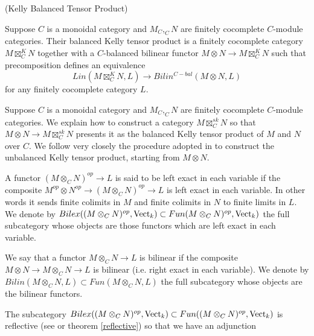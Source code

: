 \begin{definition} \label{definition/kelly-balanced-tensor-product} (Kelly Balanced Tensor Product)

  \noindent Suppose $C$ is a monoidal category and $M_C, _{C}N$ are finitely
  cocomplete $C$-module categories. Their balanced Kelly tensor product is a
  finitely cocomplete category $M\boxtimes^K_C N$ together with a $C$-balanced
  bilinear functor $M\otimes N\to M\boxtimes^K_C N$ such that precomposition
  defines an equivalence $$Lin(M\boxtimes^K_C N,L)\to Bilin^{C-bal}(M\otimes
  N, L)$$ for any finitely cocomplete category $L$.
\end{definition}

\noindent Suppose $C$ is a monoidal category and $M_C, _{C}N$ are finitely cocomplete
$C$-module categories. We explain how to construct a category
$M\boxtimes_C^{sk}N$ so that $M\otimes N\to M\boxtimes_C^{sk}N$ presents it as
the balanced Kelly tensor product of $M$ and $N$ over $C$. We follow very
closely the procedure adopted in \cite{lopezfranco/tensor-products} to
construct the unbalanced Kelly tensor product, starting from $M\otimes N$.

\begin{definition}

  \noindent A functor $(M\otimes_C N)^{op}\to L$ is said to be left exact in
  each variable if the composite $M^{op}\otimes N^{op}\to (M\otimes_C
  N)^{op}\to L$ is left exact in each variable. In other words it sends finite
  colimits in $M$ and finite colimits in $N$ to finite limits in $L$. We
  denote by $Bilex((M\otimes_C N)^{op},\operatorname{Vect}_k)\subset Fun(M\otimes_C
  N)^{op},\operatorname{Vect}_k)$ the full subcategory whose objects are those functors
  which are left exact in each variable.
\end{definition}

\begin{definition}

  \noindent We say that a functor $M\otimes_C N \to L$ is bilinear if the
  composite $M\otimes N\to M\otimes_C N \to L$ is bilinear (i.e. right exact
  in each variable). We denote by $Bilin(M\otimes_C N, L)\subset
  Fun(M\otimes_C N, L)$ the full subcategory whose objects are the bilinear
  functors.
\end{definition}

\noindent The subcategory $Bilex((M\otimes_C N)^{op},\operatorname{Vect}_k)\subset Fun((M\otimes_C
N)^{op},\operatorname{Vect}_k)$ is reflective (see \cite[theorem
  6.5]{kelly/basic-concepts-enriched} or theorem \ref{reflective}) so that we
have an adjunction

